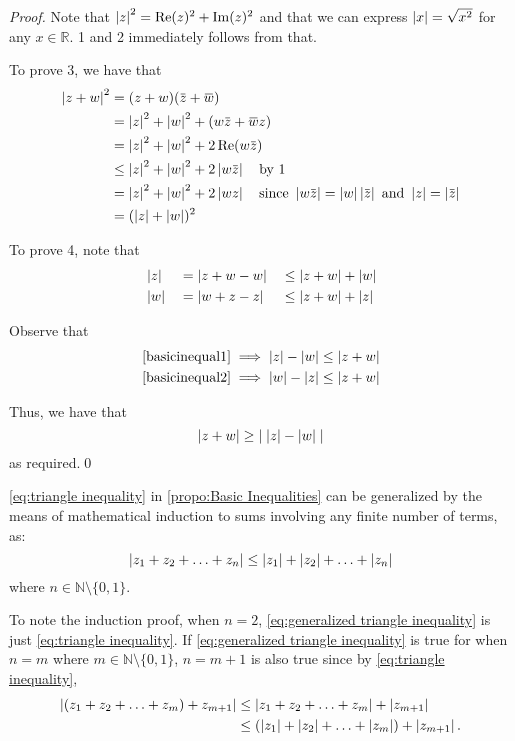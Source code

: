 \documentclass[notoc,notitlepage]{tufte-book}
\begin{document}
\begin{proof}
	Note that $\left|z\right|^2 = \operatorname{Re}(z)^2 + \operatorname{Im}(z)^2$ and that we can express $\left|x\right| = \sqrt{x^2}$ for any $x \in \mathbb{R} $. 1 and 2 immediately follows from that.

	To prove 3, we have that
	\begin{align*}
		\abs{z + w}^2 &= (z + w)(\bar{z} + \bar{w}) \\
				&= \abs{z}^2 + \abs{w}^2 + (w\bar{z} + \bar{w}z) \\
				&= \abs{z}^2 + \abs{w}^2 + 2\re(w\bar{z}) \\
				&\leq \abs{z}^2 + \abs{w}^2 + 2\abs{w\bar{z}} \quad \text{by 1} \\
				&= \abs{z}^2 + \abs{w}^2 + 2\abs{wz} \quad \text{since } \abs{w\bar{z}} = \abs{w}\abs{\bar{z}} \text{ and } \abs{z} = \abs{\bar{z}} \\
				&= (\abs{z} + \abs{w})^2
	\end{align*}
	
	To prove 4, note that
	\begin{alignat}{3}
		&\left|z\right| &&= \left|z + w - w\right| &&\leq \left|z + w\right| + \left|w\right| \label{basicinequal1} \\
		&\left|w\right| &&= \left|w + z - z\right| &&\leq \left|z + w\right| + \left|z\right| \label{basicinequal2}
	\end{alignat}

	Observe that
	\begin{align*}
		\cref{basicinequal1} \implies \abs{z} - \abs{w} \leq \abs{z + w} \\
		\cref{basicinequal2} \implies \abs{w} - \abs{z} \leq \abs{z + w}
	\end{align*}

	Thus, we have that
	\begin{equation*}
		\left|z + w\right| \geq \left|\; \left|z\right| - \left|w\right| \;\right|
	\end{equation*}
	as required.\qed
\end{proof}

\cref{eq:triangle inequality} in \cref{propo:Basic Inequalities} can be generalized by the means of mathematical induction to sums involving any finite number of terms, as:
\begin{equation}\label{eq:generalized triangle inequality}
	\left|z_1 + z_2 + \hdots + z_n\right| \leq \left|z_1\right| + \left|z_2\right| + \hdots + \left|z_n\right|
\end{equation}
where $n \in \mathbb{N} \setminus \{0, 1\}$.

To note the induction proof, when $n = 2$, \cref{eq:generalized triangle inequality} is just \cref{eq:triangle inequality}. If \cref{eq:generalized triangle inequality} is true for when $n = m$ where $m \in \mathbb{N} \setminus \{0, 1\}$, $n = m + 1$ is also true since by \cref{eq:triangle inequality},
\begin{align*}
	\left|(z_1 + z_2 + \hdots + z_m) + z_{m+1}\right| &\leq \left|z_1 + z_2 + \hdots + z_m\right| + \left|z_{m + 1}\right| \\
			&\leq (\left|z_1\right| + \left|z_2\right| + \hdots + \left|z_m\right|) + \left|z_{m+1}\right|.
\end{align*}
\end{document}
